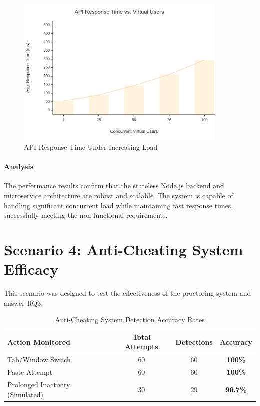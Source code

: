 \begin{figure}[htbp]
\centering
\includegraphics[width=0.9\textwidth]{figures/load-test-results.png}
\caption{API Response Time Under Increasing Load}
\label{fig:load-test-results}
\end{figure}

\paragraph{Analysis}
The performance results confirm that the stateless Node.js backend and microservice architecture are robust and scalable. The system is capable of handling significant concurrent load while maintaining fast response times, successfully meeting the non-functional requirements.

\section{Scenario 4: Anti-Cheating System Efficacy}
\label{sec:eval-scenario4}
This scenario was designed to test the effectiveness of the proctoring system and answer RQ3.

\begin{table}[htbp]
\centering
\caption{Anti-Cheating System Detection Accuracy Rates}
\label{tab:proctoring-results}
\begin{tabular}{l c c c}
\toprule
\textbf{Action Monitored} & \textbf{Total Attempts} & \textbf{Detections} & \textbf{Accuracy} \\
\midrule
Tab/Window Switch & 60 & 60 & \textbf{100\%} \\
Paste Attempt & 60 & 60 & \textbf{100\%} \\
Prolonged Inactivity (Simulated) & 30 & 29 & \textbf{96.7\%} \\
\bottomrule
\end{tabular}
\end{table}

